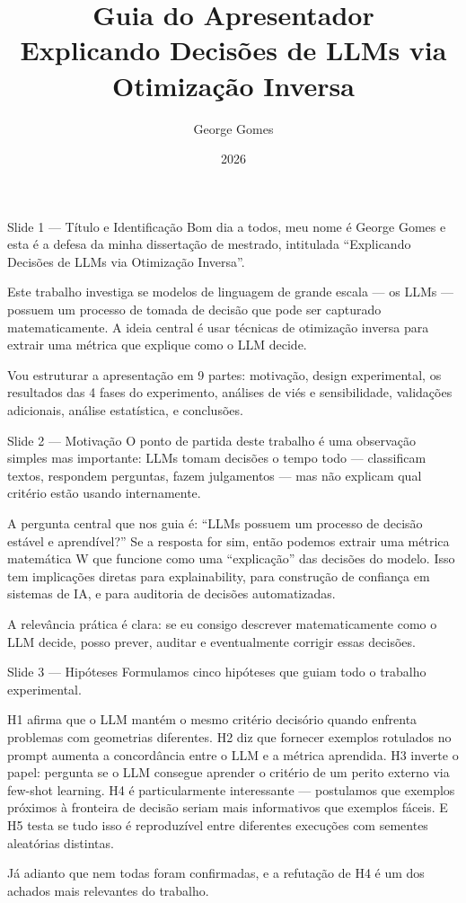 \documentclass[aspectratio=169,11pt]{beamer}
\title[Guia --- Decisões de LLMs]{Guia do Apresentador\\Explicando Decisões de LLMs via Otimização Inversa}
\author{George Gomes}
\date{2026}
\begin{document}
\begin{frame}{Slide 1 --- Título e Identificação}
\small
Bom dia a todos, meu nome é George Gomes e esta é a defesa da minha dissertação de mestrado, intitulada ``Explicando Decisões de LLMs via Otimização Inversa''.

Este trabalho investiga se modelos de linguagem de grande escala --- os LLMs --- possuem um processo de tomada de decisão que pode ser capturado matematicamente. A ideia central é usar técnicas de otimização inversa para extrair uma métrica que explique como o LLM decide.

Vou estruturar a apresentação em 9 partes: motivação, design experimental, os resultados das 4 fases do experimento, análises de viés e sensibilidade, validações adicionais, análise estatística, e conclusões.
\end{frame}

\begin{frame}{Slide 2 --- Motivação}
\small
O ponto de partida deste trabalho é uma observação simples mas importante: LLMs tomam decisões o tempo todo --- classificam textos, respondem perguntas, fazem julgamentos --- mas não explicam qual critério estão usando internamente.

A pergunta central que nos guia é: ``LLMs possuem um processo de decisão estável e aprendível?'' Se a resposta for sim, então podemos extrair uma métrica matemática W que funcione como uma ``explicação'' das decisões do modelo. Isso tem implicações diretas para explainability, para construção de confiança em sistemas de IA, e para auditoria de decisões automatizadas.

A relevância prática é clara: se eu consigo descrever matematicamente como o LLM decide, posso prever, auditar e eventualmente corrigir essas decisões.
\end{frame}

\begin{frame}{Slide 3 --- Hipóteses}
\small
Formulamos cinco hipóteses que guiam todo o trabalho experimental.

H1 afirma que o LLM mantém o mesmo critério decisório quando enfrenta problemas com geometrias diferentes. H2 diz que fornecer exemplos rotulados no prompt aumenta a concordância entre o LLM e a métrica aprendida. H3 inverte o papel: pergunta se o LLM consegue aprender o critério de um perito externo via few-shot learning. H4 é particularmente interessante --- postulamos que exemplos próximos à fronteira de decisão seriam mais informativos que exemplos fáceis. E H5 testa se tudo isso é reproduzível entre diferentes execuções com sementes aleatórias distintas.

Já adianto que nem todas foram confirmadas, e a refutação de H4 é um dos achados mais relevantes do trabalho.
\end{frame}
\end{document}
